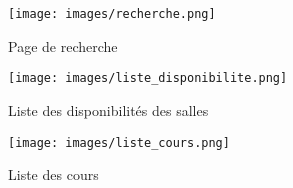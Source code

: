 \begin{figure}[H]
\begin{center}
	\texttt{[image: images/recherche.png]}
	\caption{Page de recherche}
\end{center}
\end{figure}

\begin{figure}[H]
\begin{center}
	\texttt{[image: images/liste\_disponibilite.png]}
	\caption{Liste des disponibilités des salles}
\end{center}
\end{figure}

\begin{figure}[H]
\begin{center}
	\texttt{[image: images/liste\_cours.png]}
	\caption{Liste des cours}
\end{center}
\end{figure}